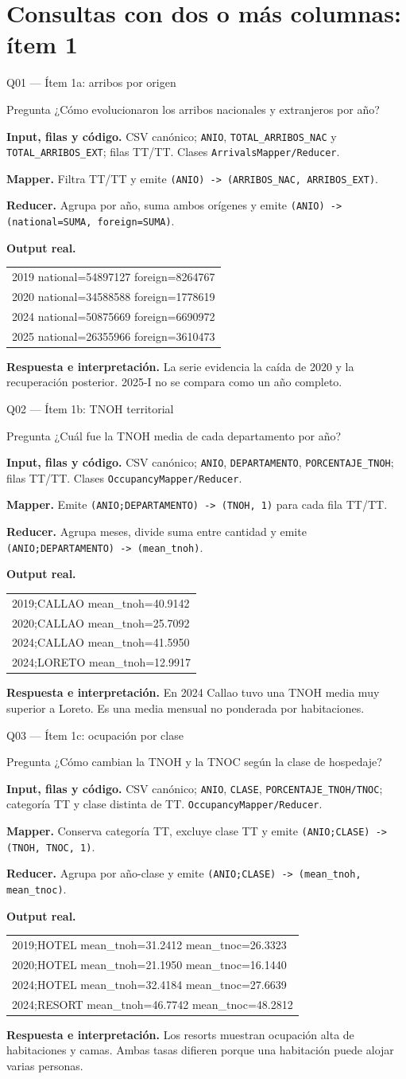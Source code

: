\documentclass{beamer}
\newcommand{\queryframe}[7]{%
\begin{frame}{#1}
\scriptsize
\begin{alertblock}{Pregunta}
#2
\end{alertblock}
\textbf{Input, filas y código.} #3

\vspace{0.45em}
\textbf{Mapper.} #4

\vspace{0.45em}
\textbf{Reducer.} #5

\vspace{0.45em}
\textbf{Output real.} {\ttfamily\tiny #6}

\vspace{0.45em}
\textbf{Respuesta e interpretación.} #7
\end{frame}
}
\begin{document}
\section{Consultas con dos o más columnas: ítem 1}

\queryframe{Q01 — Ítem 1a: arribos por origen}
{¿Cómo evolucionaron los arribos nacionales y extranjeros por año?}
{CSV canónico; \texttt{ANIO}, \texttt{TOTAL\_ARRIBOS\_NAC} y \texttt{TOTAL\_ARRIBOS\_EXT}; filas TT/TT. Clases \texttt{ArrivalsMapper/Reducer}.}
{Filtra TT/TT y emite \texttt{(ANIO) -> (ARRIBOS\_NAC, ARRIBOS\_EXT)}.}
{Agrupa por año, suma ambos orígenes y emite \texttt{(ANIO) -> (national=SUMA, foreign=SUMA)}.}
{\begin{tabular}{@{}l@{}}
2019 national=54897127 foreign=8264767 \\
2020 national=34588588 foreign=1778619 \\
2024 national=50875669 foreign=6690972 \\
2025 national=26355966 foreign=3610473
\end{tabular}}
{La serie evidencia la caída de 2020 y la recuperación posterior. 2025-I no se compara como un año completo.}

\queryframe{Q02 — Ítem 1b: TNOH territorial}
{¿Cuál fue la TNOH media de cada departamento por año?}
{CSV canónico; \texttt{ANIO}, \texttt{DEPARTAMENTO}, \texttt{PORCENTAJE\_TNOH}; filas TT/TT. Clases \texttt{OccupancyMapper/Reducer}.}
{Emite \texttt{(ANIO;DEPARTAMENTO) -> (TNOH, 1)} para cada fila TT/TT.}
{Agrupa meses, divide suma entre cantidad y emite \texttt{(ANIO;DEPARTAMENTO) -> (mean\_tnoh)}.}
{\begin{tabular}{@{}l@{}}
2019;CALLAO mean\_tnoh=40.9142 \\
2020;CALLAO mean\_tnoh=25.7092 \\
2024;CALLAO mean\_tnoh=41.5950 \\
2024;LORETO mean\_tnoh=12.9917
\end{tabular}}
{En 2024 Callao tuvo una TNOH media muy superior a Loreto. Es una media mensual no ponderada por habitaciones.}

\queryframe{Q03 — Ítem 1c: ocupación por clase}
{¿Cómo cambian la TNOH y la TNOC según la clase de hospedaje?}
{CSV canónico; \texttt{ANIO}, \texttt{CLASE}, \texttt{PORCENTAJE\_TNOH/TNOC}; categoría TT y clase distinta de TT. \texttt{OccupancyMapper/Reducer}.}
{Conserva categoría TT, excluye clase TT y emite \texttt{(ANIO;CLASE) -> (TNOH, TNOC, 1)}.}
{Agrupa por año-clase y emite \texttt{(ANIO;CLASE) -> (mean\_tnoh, mean\_tnoc)}.}
{\begin{tabular}{@{}l@{}}
2019;HOTEL mean\_tnoh=31.2412 mean\_tnoc=26.3323 \\
2020;HOTEL mean\_tnoh=21.1950 mean\_tnoc=16.1440 \\
2024;HOTEL mean\_tnoh=32.4184 mean\_tnoc=27.6639 \\
2024;RESORT mean\_tnoh=46.7742 mean\_tnoc=48.2812
\end{tabular}}
{Los resorts muestran ocupación alta de habitaciones y camas. Ambas tasas difieren porque una habitación puede alojar varias personas.}
\end{document}

